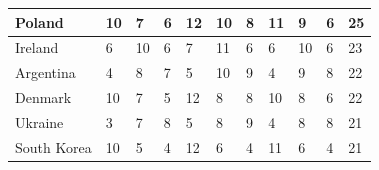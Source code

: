 \documentclass[12pt]{article}  %
\begin{document}
\begin{subappendices}
\begin{longtable}{|l|l|l|l|l|l|l|l|l|l|l|}
	\hline
	Poland                                                         & 10                                                & 7                                                 & 6                                                 & 12                                                & 10                                                & 8                                                 & 11   & 9      & 6      & 25     \\ 
	\hline
	Ireland                                                        & 6                                                 & 10                                                & 6                                                 & 7                                                 & 11                                                & 6                                                 & 6    & 10     & 6      & 23     \\ 
	\hline
	Argentina                                                      & 4                                                 & 8                                                 & 7                                                 & 5                                                 & 10                                                & 9                                                 & 4    & 9      & 8      & 22     \\ 
	\hline
	Denmark                                                        & 10                                                & 7                                                 & 5                                                 & 12                                                & 8                                                 & 8                                                 & 10   & 8      & 6      & 22     \\ 
	\hline
	Ukraine                                                        & 3                                                 & 7                                                 & 8                                                 & 5                                                 & 8                                                 & 9                                                 & 4    & 8      & 8      & 21     \\ 
	\hline
	South Korea                                                    & 10                                                & 5                                                 & 4                                                 & 12                                                & 6                                                 & 4                                                 & 11   & 6      & 4      & 21     \\ 

\end{longtable}
\end{subappendices}
\end{document}
